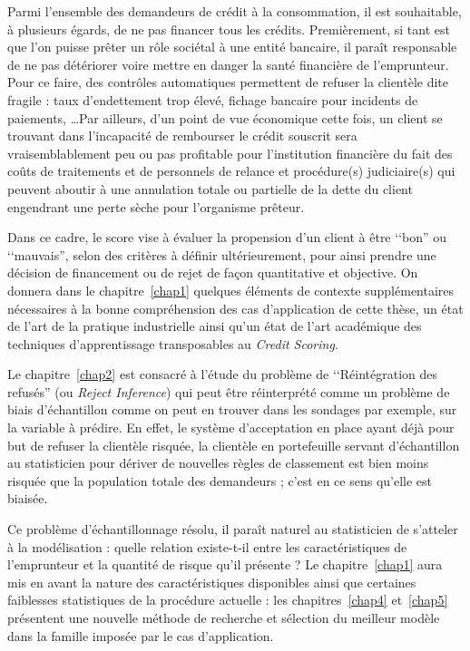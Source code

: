 Parmi l'ensemble des demandeurs de crédit à la consommation, il est souhaitable, à plusieurs égards, de ne pas financer tous les crédits. Premièrement, si tant est que l'on puisse prêter un rôle sociétal à une entité bancaire, il paraît responsable de ne pas détériorer voire mettre en danger la santé financière de l'emprunteur. Pour ce faire, des contrôles automatiques permettent de refuser la clientèle dite fragile : taux d'endettement trop élevé, fichage bancaire pour incidents de paiements, \ldots Par ailleurs, d'un point de vue économique cette fois, un client se trouvant dans l'incapacité de rembourser le crédit souscrit sera vraisemblablement peu ou pas profitable pour l'institution financière du fait des coûts de traitements et de personnels de relance et procédure(s) judiciaire(s) qui peuvent aboutir à une annulation totale ou partielle de la dette du client engendrant une perte sèche pour l'organisme prêteur.

Dans ce cadre, le score vise à évaluer la propension d'un client à être ‘‘bon'' ou ‘‘mauvais'', selon des critères à définir ultérieurement, pour ainsi prendre une décision de financement ou de rejet de façon quantitative et objective. On donnera dans le chapitre~\ref{chap1} quelques éléments de contexte supplémentaires nécessaires à la bonne compréhension des cas d'application de cette thèse, un état de l'art de la pratique industrielle ainsi qu'un état de l'art académique des techniques d'apprentissage transposables au \textit{Credit Scoring}.

Le chapitre~\ref{chap2} est consacré à l'étude du problème de ‘‘Réintégration des refusés'' (ou \textit{Reject Inference}) qui peut être réinterprété comme un problème de biais d'échantillon comme on peut en trouver dans les sondages par exemple, sur la variable à prédire. En effet, le système d'acceptation en place ayant déjà pour but de refuser la clientèle risquée, la clientèle en portefeuille servant d'échantillon au statisticien pour dériver de nouvelles règles de classement est bien moins risquée que la population totale des demandeurs ; c'est en ce sens qu'elle est biaisée.

Ce problème d'échantillonnage résolu, il paraît naturel au statisticien de s'atteler à la modélisation : quelle relation existe-t-il entre les caractéristiques de l'emprunteur et la quantité de risque qu'il présente ? Le chapitre~\ref{chap1} aura mis en avant la nature des caractéristiques disponibles ainsi que certaines faiblesses statistiques de la procédure actuelle : les chapitres~\ref{chap4} et~\ref{chap5} présentent une nouvelle méthode de recherche et sélection du meilleur modèle dans la famille imposée par le cas d'application.

